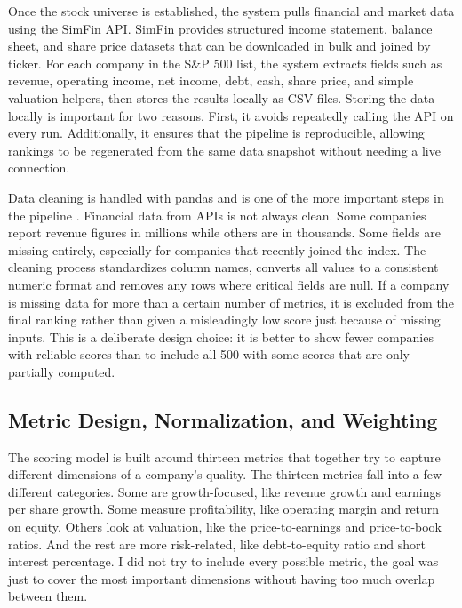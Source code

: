 \documentclass[12pt]{article}
\begin{document}
Once the stock universe is established, the system pulls financial and market data using the SimFin API. SimFin provides structured income statement, balance sheet, and share price datasets that can be downloaded in bulk and joined by ticker. For each company in the S\&P 500 list, the system extracts fields such as revenue, operating income, net income, debt, cash, share price, and simple valuation helpers, then stores the results locally as CSV files. Storing the data locally is important for two reasons. First, it avoids repeatedly calling the API on every run. Additionally, it ensures that the pipeline is reproducible, allowing rankings to be regenerated from the same data snapshot without needing a live connection.

Data cleaning is handled with pandas and is one of the more important steps in the pipeline \cite{McKinney2010Pandas}. Financial data from APIs is not always clean. Some companies report revenue figures in millions while others are in thousands. Some fields are missing entirely, especially for companies that recently joined the index. The cleaning process standardizes column names, converts all values to a consistent numeric format and removes any rows where critical fields are null. If a company is missing data for more than a certain number of metrics, it is excluded from the final ranking rather than given a misleadingly low score just because of missing inputs. This is a deliberate design choice: it is better to show fewer companies with reliable scores than to include all 500 with some scores that are only partially computed.

\subsection{Metric Design, Normalization, and Weighting}
The scoring model is built around thirteen metrics that together try to capture different dimensions of a company's quality. The thirteen metrics fall into a few different categories. Some are growth-focused, like revenue growth and earnings per share growth. Some measure profitability, like operating margin and return on equity. Others look at valuation, like the price-to-earnings and price-to-book ratios. And the rest are more risk-related, like debt-to-equity ratio and short interest percentage. I did not try to include every possible metric, the goal was just to cover the most important dimensions without having too much overlap between them.
\end{document}
